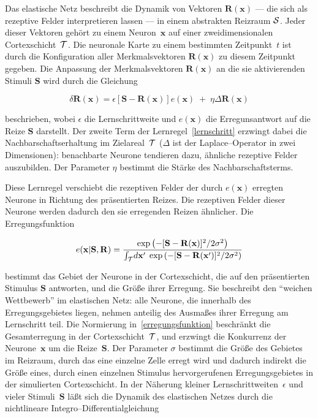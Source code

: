 Das elastische Netz beschreibt die Dynamik von Vektoren $\mathbf{R(x)}$ ---
die sich als rezeptive Felder interpretieren lassen --- in einem abstrakten
Reizraum $\cal S$. Jeder dieser Vektoren gehört zu einem
Neuron~$\mathbf{x}$ auf einer zweidimensionalen Cortexschicht~$\cal T$.
Die neuronale Karte zu einem bestimmten Zeitpunkt~$t$ ist durch die
Konfiguration aller Merkmalsvektoren $\mathbf{R(x)}$ zu diesem Zeitpunkt
gegeben. Die Anpassung der Merkmalsvektoren $\mathbf{R(x)}$ an die sie
aktivierenden Stimuli $\mathbf{S}$ wird durch die Gleichung

\begin{equation}
    \delta\mathbf{R(x)}=\epsilon\left[\mathbf{S-R(x)}\right]
    e(\mathbf{x})\;+\;\eta\Delta \mathbf{R(x)}
    \label{lernschritt}
\end{equation}

beschrieben, wobei $\epsilon$ die Lernschrittweite und $e(\mathbf{x})$ die
Erregunsantwort auf die Reize $\mathbf{S}$ darstellt. Der zweite Term der
Lernregel~\eqref{lernschritt} erzwingt dabei die Nachbarschaftserhaltung im
Zielareal~$\cal T$ ($\Delta$ ist der Laplace--Operator in zwei
Dimensionen): benachbarte Neurone tendieren dazu, ähnliche rezeptive
Felder auszubilden. Der Parameter $\eta$ bestimmt die Stärke des
Nachbarschaftsterms.

Diese Lernregel verschiebt die rezeptiven Felder der durch $e(\mathbf{x})$
erregten Neurone in Richtung des präsentierten Reizes. Die rezeptiven
Felder dieser Neurone werden dadurch den sie erregenden Reizen ähnlicher.
Die Erregungsfunktion

\begin{equation}
    e(\mathbf{x|S,R})=\frac{\exp\left(-[\mathbf{S-R(x)}]^2/2\sigma^2\right)}
    {\int_{\cal
        T}\!d\mathbf{x}^\prime\;\exp\left(-[\mathbf{S-R(\mathbf{x}^\prime)}]^2/2
        \sigma^2\right)}
    \label{erregungsfunktion}
\end{equation}

\noindent bestimmt das Gebiet der Neurone in der Cortexschicht, die auf den
präsentierten Stimulus $\mathbf{S}$ antworten, und die Größe ihrer
Erregung. Sie beschreibt den ``weichen Wettbewerb'' im elastischen Netz:
alle Neurone, die innerhalb des Erregungsgebietes liegen, nehmen anteilig
des Ausmaßes ihrer Erregung am Lernschritt teil. Die Normierung
in~\eqref{erregungsfunktion} beschränkt die Gesamterregung in der
Cortexschicht~$\cal T$, und erzwingt die Konkurrenz der
Neurone~$\mathbf{x}$ um die Reize~$\mathbf{S}$. Der Parameter $\sigma$
bestimmt die Größe des Gebietes im Reizraum, durch das eine einzelne
Zelle erregt wird und dadurch indirekt die Größe eines, durch einen
einzelnen Stimulus hervorgerufenen Erregungsgebietes in der simulierten
Cortexschicht. In der Näherung kleiner Lernschrittweiten~$\epsilon$ und
vieler Stimuli~$\mathbf{S}$ läßt sich die Dynamik des elastischen Netzes
durch die nichtlineare Integro--Differentialgleichung

